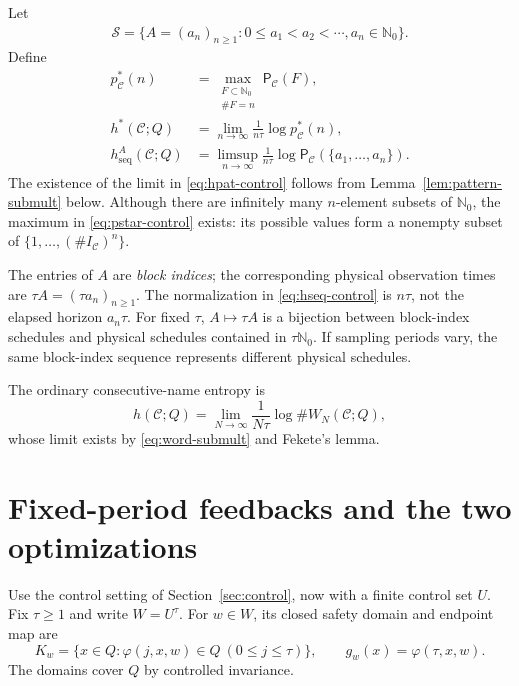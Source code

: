 \documentclass[11pt,reqno]{amsart}
\numberwithin{equation}{section}
\theoremstyle{definition}
\newcommand{\Nzero}{\mathbb N_0}
\newcommand{\C}{\mathcal C}
\newcommand{\Patt}{\mathsf P}
\newcommand{\hseq}{h_{\mathrm{seq}}}
\newcommand{\hpat}{h^{*}}
\begin{document}
Let
\begin{align*}
 \mathscr S=\{A=(a_n)_{n\ge1}:0\le a_1<a_2<\cdots, a_n\in\Nzero\}.
\end{align*}
Define
\begin{align}
 p_\C^*(n)&=\max_{\substack{F\subset\Nzero\\\#F=n}}\Patt_\C(F),
 \label{eq:pstar-control}\\
 \hpat(\C;Q)&=\lim_{n\to\infty}\frac1{n\tau}\log p_\C^*(n),
 \label{eq:hpat-control}\\
 \hseq^A(\C;Q)&=\limsup_{n\to\infty}\frac1{n\tau}
 \log\Patt_\C(\{a_1,\ldots,a_n\}).
 \label{eq:hseq-control}
\end{align}
The existence of the limit in \eqref{eq:hpat-control} follows from
Lemma~\ref{lem:pattern-submult} below.  Although there are infinitely many
$n$-element subsets of $\Nzero$, the maximum in \eqref{eq:pstar-control}
exists: its possible values form a nonempty subset of
$\{1,\ldots,(\#I_\C)^n\}$.

The entries of $A$ are \emph{block indices}; the corresponding physical
observation times are $\tau A=(\tau a_n)_{n\ge1}$.  The normalization in
\eqref{eq:hseq-control} is $n\tau$, not the elapsed horizon $a_n\tau$.
For fixed $\tau$, $A\mapsto\tau A$ is a bijection between block-index
schedules and physical schedules contained in $\tau\Nzero$.  If sampling
periods vary, the same block-index sequence represents different physical
schedules.

The ordinary consecutive-name entropy is
\begin{equation}\label{eq:ordinary-partition-entropy}
 h(\C;Q)=\lim_{N\to\infty}\frac1{N\tau}\log\#W_N(\C;Q),
\end{equation}
whose limit exists by \eqref{eq:word-submult} and Fekete's lemma.


\section{Fixed-period feedbacks and the two optimizations}\label{sec:selectors}

Use the control setting of Section~\ref{sec:control}, now with a
finite control set $U$. Fix $\tau\ge1$ and write $W=U^\tau$.
For $w\in W$, its closed safety domain and endpoint map are
\begin{equation}\label{cc-eq:safe}
 K_w=\{x\in Q:\varphi(j,x,w)\in Q\ (0\le j\le\tau)\},
 \qquad g_w(x)=\varphi(\tau,x,w).
\end{equation}
The domains cover $Q$ by controlled invariance.
\end{document}
